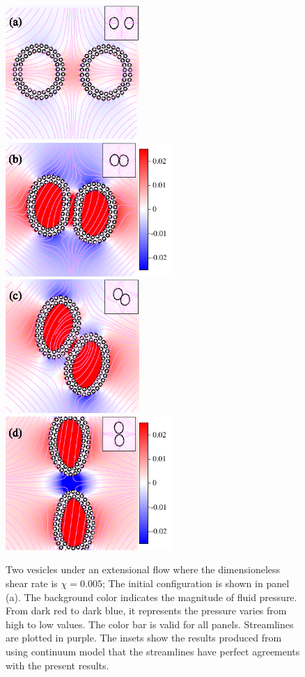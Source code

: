 \documentclass[lineno]{jfm}
\begin{document}
\begin{figure}
\centering
\includegraphics[height=2in]{N116_ext_0.pdf}
\includegraphics[height=2in]{N116_ext_2000.pdf}\\
\includegraphics[height=2in]{N116_ext_4000.pdf}
\includegraphics[height=2in]{N116_ext_6500.pdf}
  \caption{\label{figure12} Two vesicles under an extensional flow where
  the dimensioneless shear rate is $\chi=0.005$; The initial
  configuration is shown in panel (a). The background color indicates
  the magnitude of fluid pressure. From dark red to dark blue, it
  represents the pressure varies from high to low values. The color bar
  is valid for all panels. Streamlines are plotted in purple. The insets
  show the results produced from using continuum model that the
  streamlines have perfect agreements with the present results.}
\end{figure}
\end{document}
